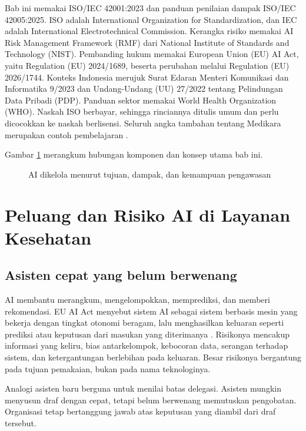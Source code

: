 Bab ini memakai ISO/IEC 42001:2023 dan panduan penilaian dampak ISO/IEC 42005:2025. ISO adalah
International Organization for Standardization, dan IEC adalah International Electrotechnical
Commission. Kerangka risiko memakai AI Risk Management Framework (RMF) dari National Institute of
Standards and Technology (NIST). Pembanding hukum memakai European Union (EU) AI Act, yaitu
Regulation (EU) 2024/1689, beserta perubahan melalui Regulation (EU) 2026/1744. Konteks Indonesia
merujuk Surat Edaran Menteri Komunikasi dan Informatika 9/2023 dan Undang-Undang (UU) 27/2022
tentang Pelindungan Data Pribadi (PDP). Panduan sektor memakai World Health Organization (WHO).
Naskah ISO berbayar, sehingga rinciannya ditulis umum dan perlu dicocokkan ke naskah berlisensi.
Seluruh angka tambahan tentang Medikara merupakan contoh pembelajaran
\cite{iso42001-2023,c11-iso42005,c11-nist-airmf,euaiact2024,c11-eu2026-1744,%
c11-se9-2023,uu27-2022-pdp,c11-who2021}.

Gambar \ref{fig:ch11-ilustrasi-bab} merangkum hubungan komponen dan konsep utama bab ini.
\begin{figure}[!htb]
  \centering
  
  \caption{AI dikelola menurut tujuan, dampak, dan kemampuan pengawasan}
  \label{fig:ch11-ilustrasi-bab}
\end{figure}

\section{Peluang dan Risiko AI di Layanan Kesehatan}

\subsection*{Asisten cepat yang belum berwenang}

AI membantu merangkum, mengelompokkan, memprediksi, dan memberi rekomendasi. EU AI Act menyebut
sistem AI sebagai sistem berbasis mesin yang bekerja dengan tingkat otonomi beragam, lalu
menghasilkan keluaran seperti prediksi atau keputusan dari masukan yang diterimanya
\cite{euaiact2024,c11-aiact-explorer}. Risikonya mencakup informasi yang keliru, bias
antarkelompok, kebocoran data, serangan terhadap sistem, dan ketergantungan berlebihan pada
keluaran. Besar risikonya bergantung pada tujuan pemakaian, bukan pada nama teknologinya.

Analogi asisten baru berguna untuk menilai batas delegasi. Asisten mungkin menyusun draf dengan
cepat, tetapi belum berwenang memutuskan pengobatan. Organisasi tetap bertanggung jawab atas
keputusan yang diambil dari draf tersebut.

